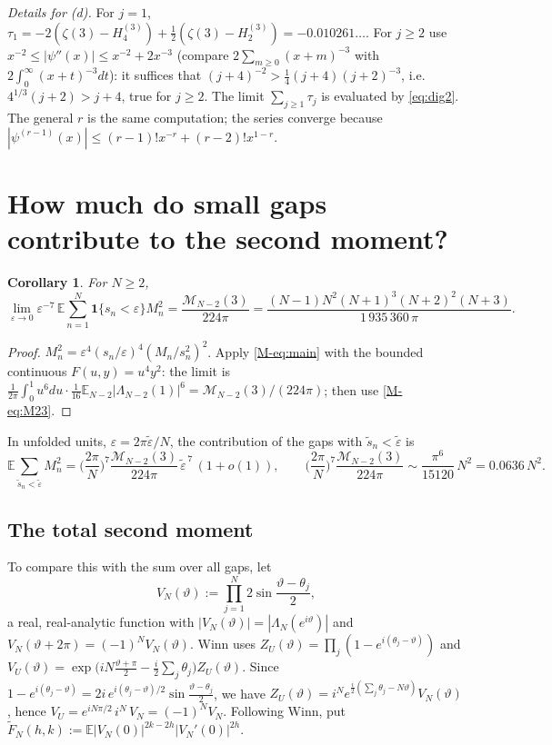 \documentclass[12pt]{amsart}
\newtheorem{corollary}[theorem]{Corollary}
\theoremstyle{remark}
\newcommand{\E}{\mathbb{E}}
\newcommand{\eps}{\varepsilon}
\newcommand{\1}{\mathbf{1}}
\begin{document}
\emph{Details for (d).} For $j=1$,
$\tau_1=-2(\zeta(3)-H_4^{(3)})+\frac12(\zeta(3)-H_2^{(3)})=-0.010261\ldots$.
For $j\ge2$ use $x^{-2}\le|\psi''(x)|\le x^{-2}+2x^{-3}$ (compare
$2\sum_{m\ge0}(x+m)^{-3}$ with $2\int_0^\infty(x+t)^{-3}dt$): it suffices
that $(j+4)^{-2}>\frac14(j+4)(j+2)^{-3}$, i.e.\
$4^{1/3}(j+2)>j+4$, true for $j\ge2$. The limit $\sum_{j\ge1}\tau_j$ is
evaluated by \eqref{eq:dig2}. The general $r$ is the same computation; the
series converge because $|\psi^{(r-1)}(x)|\le(r-1)!x^{-r}+(r-2)!x^{1-r}$.

\section{How much do small gaps contribute to the second moment?}\label{sec:second}

\begin{corollary}\label{cor:second}
For $N\ge2$,
\[
\lim_{\eps\to0}\eps^{-7}\,\E\sum_{n=1}^N\1\{s_n<\eps\}M_n^2
=\frac{\mathcal M_{N-2}(3)}{224\pi}
=\frac{(N-1)N^2(N+1)^3(N+2)^2(N+3)}{1\,935\,360\,\pi}.
\]
\end{corollary}

\begin{proof}
$M_n^2=\eps^4(s_n/\eps)^4(M_n/s_n^2)^2$. Apply \eqref{M-eq:main} with the
bounded continuous $F(u,y)=u^4y^2$: the limit is
$\frac1{2\pi}\int_0^1u^6du\cdot\frac1{16}\E_{N-2}|\Lambda_{N-2}(1)|^6
=\mathcal M_{N-2}(3)/(224\pi)$; then use \eqref{M-eq:M23}.
\end{proof}

In unfolded units, $\eps=2\pi\tilde\eps/N$, the contribution of the gaps
with $\tilde s_n<\tilde\eps$ is
\[
\E\sum_{\tilde s_n<\tilde\eps}M_n^2=\Big(\frac{2\pi}N\Big)^7
\frac{\mathcal M_{N-2}(3)}{224\pi}\,\tilde\eps^{\,7}\,(1+o(1)),
\qquad
\Big(\frac{2\pi}N\Big)^7\frac{\mathcal M_{N-2}(3)}{224\pi}\sim
\frac{\pi^6}{15120}\,N^2=0.0636\,N^2 .
\]

\subsection*{The total second moment}
To compare this with the sum over all gaps, let
\[
V_N(\vartheta):=\prod_{j=1}^N2\sin\frac{\vartheta-\theta_j}2 ,
\]
a real, real-analytic function with $|V_N(\vartheta)|=|\Lambda_N(e^{i\vartheta})|$
and $V_N(\vartheta+2\pi)=(-1)^NV_N(\vartheta)$. Winn \cite[(1.1)--(1.2)]{Win12}
uses $Z_U(\vartheta)=\prod_j(1-e^{i(\theta_j-\vartheta)})$ and
$V_U(\vartheta)=\exp\big(iN\frac{\vartheta+\pi}2-\frac i2\sum_j\theta_j\big)
Z_U(\vartheta)$. Since
$1-e^{i(\theta_j-\vartheta)}=2i\,e^{i(\theta_j-\vartheta)/2}
\sin\frac{\vartheta-\theta_j}2$, we have
$Z_U(\vartheta)=i^Ne^{\frac i2(\sum_j\theta_j-N\vartheta)}V_N(\vartheta)$,
hence $V_U=e^{iN\pi/2}\,i^N\,V_N=(-1)^NV_N$. Following Winn, put
$\widetilde F_N(h,k):=\E|V_N(0)|^{2k-2h}|V_N'(0)|^{2h}$.
\end{document}
